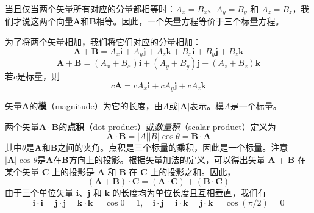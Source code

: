     当且仅当两个矢量所有对应的分量都相等时：$A_x = B_x$、$A_y = B_y$ 和 $A_z = B_z$，我们才说这两个向量$\mathbf{A}$和$\mathbf{B}$相等。因此，一个矢量方程等价于三个标量方程。

    为了将两个矢量相加，我们将它们对应的分量相加：
    \begin{equation*}
        \mathbf{A} + \mathbf{B} = A_x\mathbf{i} + A_y\mathbf{j} + A_z\mathbf{k} + B_x\mathbf{i} + B_y\mathbf{j} + B_z\mathbf{k}
    \end{equation*}
    \begin{equation}
        \boxed{
            \mathbf{A} + \mathbf{B} = (A_x + B_x)\mathbf{i} + (A_y + B_y)\mathbf{j} + (A_z + B_z)\mathbf{k}
        }
        \label{eq:5.18}
    \end{equation}
    若$c$是标量，则
    \begin{equation}
        \boxed{
            c\mathbf{A} = cA_x\mathbf{i} + cA_y\mathbf{j} + cA_z\mathbf{k}
        }
        \label{eq:5.19}
    \end{equation}

    矢量$\mathbf{A}$的\textbf{模}（magnitude）为它的长度，由$A$或$\left|\mathbf{A}\right|$表示。模$A$是一个标量。

    两个矢量$\mathbf{A}\cdot\mathbf{B}$的\textbf{点积}（dot product）或\textit{数量积}（scalar product）定义为
    \begin{equation}
        \boxed{
            \mathbf{A}\cdot\mathbf{B} = \left|A\right|\left|B\right|\cos\theta = \mathbf{B}\cdot\mathbf{A}
        }
        \label{eq:5.20}
    \end{equation}
    其中$\theta$是$\mathbf{A}$和$\mathbf{B}$之间的夹角。点积是三个标量的乘积，因此是一个标量。注意$\left|\mathbf{A}\right|\cos\theta$是$\mathbf{A}$在$\mathbf{B}$方向上的投影。根据矢量加法的定义，可以得出矢量 $\mathbf{A}$ + $\mathbf{B}$ 在某个矢量 $\mathbf{C}$ 上的投影是 $\mathbf{A}$ 和 $\mathbf{B}$ 在 $\mathbf{C}$ 上的投影之和。因此，
    \begin{equation}
        \left(\mathbf{A} + \mathbf{B}\right)\cdot\mathbf{C} = \left(\mathbf{A}\cdot\mathbf{C}\right) + \left(\mathbf{B}\cdot\mathbf{C}\right)
        \label{eq:5.21}
    \end{equation}
    由于三个单位矢量 $\mathbf{i}$、$\mathbf{j}$ 和 $\mathbf{k}$ 的长度均为单位长度且互相垂直，我们有
    \begin{equation}
        \mathbf{i}\cdot\mathbf{i} = \mathbf{j}\cdot\mathbf{j} = \mathbf{k}\cdot\mathbf{k} = \cos 0 = 1, \quad \mathbf{i}\cdot\mathbf{j} = \mathbf{i}\cdot\mathbf{k} = \mathbf{j}\cdot\mathbf{k} = \cos \left(\pi/2\right) = 0
        \label{eq:5.22}
    \end{equation}

